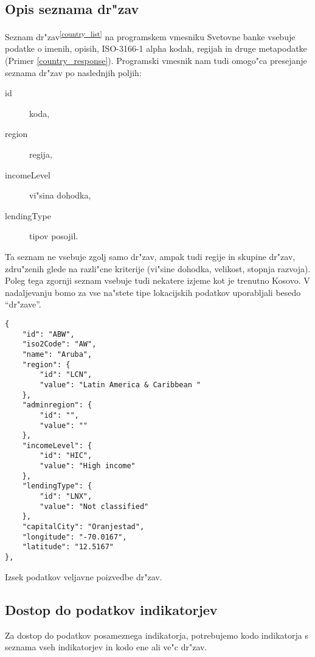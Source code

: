 \subsection{Opis seznama dr"zav}

Seznam dr"zav\textsuperscript{\ref{country_list}}  na programskem vmesniku 
Svetovne banke vsebuje podatke o imenih, opisih, ISO-3166-1 alpha kodah, 
regijah in druge metapodatke (Primer \ref{country_response}). Programski
vmesnik nam tudi omogo"ca presejanje seznama dr"zav po naslednjih poljih:
\begin{description}
\item [id] koda,
\item [region] regija,
\item [incomeLevel] vi"sina dohodka,
\item [lendingType] tipov posojil. %
\end{description}

Ta seznam ne vsebuje zgolj samo dr"zav, ampak tudi regije in skupine dr"zav, 
zdru"zenih glede na razli"cne kriterije (vi"sine dohodka, velikost, stopnja
razvoja). Poleg tega zgornji seznam vsebuje tudi nekatere izjeme kot je trenutno
Kosovo. V nadaljevanju bomo za vse na"stete tipe lokacijskih podatkov
uporabljali besedo ``dr"zave''.

\begin{snippet}
\begin{center}
\begin{lstlisting}
{
    "id": "ABW",
    "iso2Code": "AW",
    "name": "Aruba",
    "region": {
        "id": "LCN",
        "value": "Latin America & Caribbean "
    },
    "adminregion": {
        "id": "",
        "value": ""
    },
    "incomeLevel": {
        "id": "HIC",
        "value": "High income"
    },
    "lendingType": {
        "id": "LNX",
        "value": "Not classified"
    },
    "capitalCity": "Oranjestad",
    "longitude": "-70.0167",
    "latitude": "12.5167"
},
\end{lstlisting}
\end{center}
\caption[some]{Izsek podatkov veljavne poizvedbe dr"zav.}
\label{country_response}
\end{snippet} 


\subsection{Dostop do podatkov indikatorjev}


Za dostop do podatkov posameznega indikatorja, potrebujemo kodo
indikatorja s seznama vseh indikatorjev in kodo ene ali ve"c dr"zav. 

